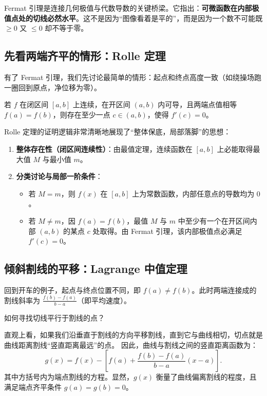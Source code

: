 Fermat 引理是连接几何极值与代数导数的关键桥梁。它指出：\textbf{可微函数在内部极值点处的切线必然水平}。这不是因为``图像看着是平的''，而是因为一个数不可能既 \(\ge 0\) 又 \(\le 0\) 却不等于零。

\subsection{先看两端齐平的情形：Rolle 定理}

有了 Fermat 引理，我们先讨论最简单的情形：起点和终点高度一致（如绕操场跑一圈回到原点，净位移为零）。

\begin{theorem}[Rolle 定理]
若 \(f\) 在闭区间 \([a,b]\) 上连续，在开区间 \((a,b)\) 内可导，且两端点值相等 \(f(a)=f(b)\)，则存在至少一点 \(c\in(a,b)\)，使得 \(f'(c)=0\)。
\end{theorem}

Rolle 定理的证明逻辑非常清晰地展现了``整体保底，局部落脚''的思想：
\begin{enumerate}
    \item \textbf{整体存在性（闭区间连续性）}：由最值定理，连续函数在 \([a,b]\) 上必能取得最大值 \(M\) 与最小值 \(m\)。
    \item \textbf{分类讨论与局部一阶条件}：
    \begin{itemize}
        \item 若 \(M = m\)，则 \(f(x)\) 在 \([a,b]\) 上为常数函数，内部任意点的导数均为 \(0\)。
        \item 若 \(M \neq m\)，因 \(f(a)=f(b)\)，最值 \(M\) 与 \(m\) 中至少有一个在开区间内部 \((a,b)\) 的某点 \(c\) 处取得。由 Fermat 引理，该内部极值点必满足 \(f'(c)=0\)。
    \end{itemize}
\end{enumerate}

\subsection{倾斜割线的平移：Lagrange 中值定理}

回到开车的例子，起点与终点位置不同，即 \(f(a) \neq f(b)\)。此时两端连接成的割线斜率为 \(\frac{f(b)-f(a)}{b-a}\)（即平均速度）。

如何寻找切线平行于割线的点？

直观上看，如果我们沿垂直于割线的方向平移割线，直到它与曲线相切，切点就是曲线距离割线``竖直距离最远''的点。
因此，曲线与割线之间的竖直距离函数为：
\[
g(x) = f(x) - \left[ f(a) + \frac{f(b)-f(a)}{b-a}(x-a) \right].
\]
其中方括号内为端点割线的方程。显然，\(g(x)\) 衡量了曲线偏离割线的程度，且满足端点齐平条件 \(g(a) = g(b) = 0\)。

